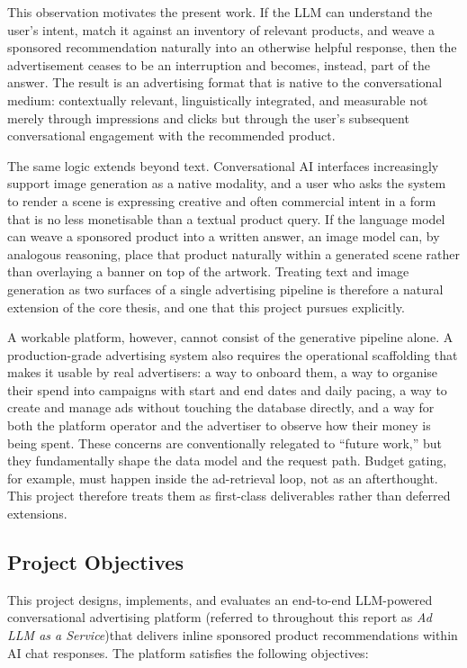 This observation motivates the present work. If the LLM can understand the
user's intent, match it against an inventory of relevant products, and weave a
sponsored recommendation naturally into an otherwise helpful response, then the
advertisement ceases to be an interruption and becomes, instead, part of the
answer. The result is an advertising format that is native to the conversational
medium: contextually relevant, linguistically integrated, and measurable not
merely through impressions and clicks but through the user's subsequent
conversational engagement with the recommended product.

The same logic extends beyond text. Conversational AI interfaces increasingly
support image generation as a native modality, and a user who asks the system
to render a scene is expressing creative and often commercial intent in a form
that is no less monetisable than a textual product query. If the language model
can weave a sponsored product into a written answer, an image model can, by
analogous reasoning, place that product naturally within a generated scene rather
than overlaying a banner on top of the artwork. Treating text and image
generation as two surfaces of a single advertising pipeline is therefore a
natural extension of the core thesis, and one that this project pursues
explicitly.

A workable platform, however, cannot consist of the generative pipeline alone.
A production-grade advertising system also requires the operational scaffolding
that makes it usable by real advertisers: a way to onboard them, a way to
organise their spend into campaigns with start and end dates and daily
pacing, a way to create and manage ads without touching the database directly,
and a way for both the platform operator and the advertiser to observe how
their money is being spent. These concerns are conventionally relegated to
``future work,'' but they fundamentally shape the data model and the request
path. Budget gating, for example, must happen inside the ad-retrieval loop,
not as an afterthought. This project therefore treats them as first-class
deliverables rather than deferred extensions.

\subsection{Project Objectives}
\label{subsec:objectives}

This project designs, implements, and evaluates an end-to-end LLM-powered
conversational advertising platform (referred to throughout this report as
\textit{Ad LLM as a Service})that delivers inline sponsored product
recommendations within AI chat responses. The platform satisfies the following
objectives:

